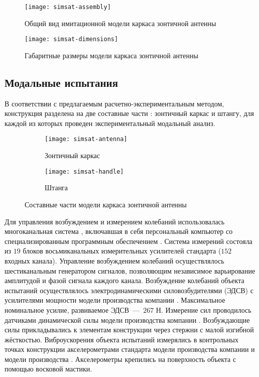 \begin{figure}[!htb]
	\centerfloat
	\texttt{[image: simsat-assembly]}
	\caption{Общий вид имитационной модели каркаса зонтичной антенны} \label{fig:simsat-assembly}
\end{figure}

\begin{figure}[H]
	\centerfloat
	\texttt{[image: simsat-dimensions]}
	\caption{Габаритные размеры модели каркаса зонтичной антенны} \label{fig:simsat-dimensions}
\end{figure}

\subsection{Модальные испытания}

В соответствии с предлагаемым расчетно-экспериментальным методом, конструкция разделена на две составные части : зонтичный каркас и штангу, для каждой из которых проведен экспериментальный модальный анализ.

\begin{figure}[!htb]
	\centering
	\begin{subfigure}[t]{0.48\textwidth}
		\centering
		\texttt{[image: simsat-antenna]}
		\caption{Зонтичный каркас}
	\end{subfigure}
	\hfill
	\begin{subfigure}[t]{0.48\textwidth}
		\centering
		\texttt{[image: simsat-handle]}
		\caption{Штанга}
	\end{subfigure}	
	\caption{Составные части модели каркаса зонтичной антенны} \label{fig:simsat-parts}
\end{figure}

Для управления возбуждением и измерением колебаний использовалась многоканальная система  , включавшая в себя персональный компьютер со специализированным программным обеспечением . Система измерений состояла из $ 19 $ блоков восьмиканальных измерительных усилителей стандарта  ($ 152 $ входных канала). Управление возбуждением колебаний осуществлялось шестиканальным генератором сигналов, позволяющим независимое варьирование амплитудой и фазой сигнала каждого канала. Возбуждение колебаний объекта испытаний осуществлялось электродинамическими силовозбудителями (ЭДСВ)  с усилителями мощности модели   производства компании  . Максимальное номинальное усилие, развиваемое ЭДСВ~---~$ 267 $ Н. Измерение сил проводилось датчиками динамической силы модели  производства компании . Возбуждающие силы прикладывались к элементам конструкции через стержни с малой изгибной жёсткостью. Виброускорения объекта испытаний измерялись в контрольных точках конструкции акселерометрами стандарта  модели  производства компании  и модели  производства  . Акселерометры крепились на поверхность объекта с помощью восковой мастики.

